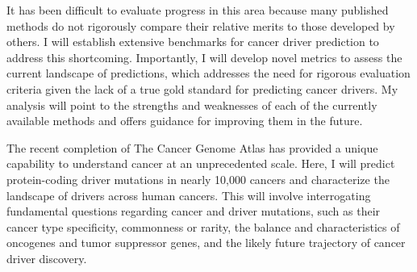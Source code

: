 It has been difficult to evaluate progress in this area because many published methods do not rigorously compare their relative merits to those developed by others. I will establish extensive benchmarks for cancer driver prediction to address this shortcoming. Importantly, I will develop novel metrics to assess the current landscape of predictions, which addresses the need for rigorous evaluation criteria given the lack of a true gold standard for predicting cancer drivers. My analysis will point to the strengths and weaknesses of each of the currently available methods and offers guidance for improving them in the future.

The recent completion of The Cancer Genome Atlas has provided a unique capability to understand cancer at an unprecedented scale. Here, I will predict protein-coding driver mutations in nearly 10,000 cancers and characterize the landscape of drivers across human cancers. This will involve interrogating fundamental questions regarding cancer and driver mutations, such as their cancer type specificity, commonness or rarity, the balance and characteristics of oncogenes and tumor suppressor genes, and the likely future trajectory of cancer driver discovery.




